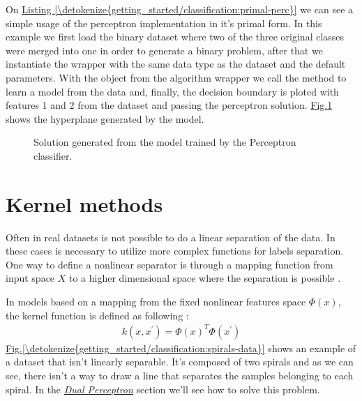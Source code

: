\documentclass[letterpaper,10pt,english]{sphinxmanual}
\let\sphinxpxdimen\pdfpxdimen\else\newdimen\sphinxpxdimen
\begin{document}
\sphinxAtStartPar
On \hyperref[\detokenize{getting_started/classification:primal-perc}]{Listing \ref{\detokenize{getting_started/classification:primal-perc}}} we can see a simple usage of the  perceptron implementation in it’s primal form. In this example we first
load the binary  dataset where two of the three original classes were merged into one in order to generate a binary problem, after that we instantiate
the  wrapper with the same data type as the dataset and the default parameters. With the object from the algorithm wrapper we call the
method  to learn a model from the data and, finally, the decision boundary is ploted with features 1 and 2 from the dataset and passing the perceptron solution. \hyperref[\detokenize{getting_started/classification:primal-perc-hyp}]{Fig.\@ \ref{\detokenize{getting_started/classification:primal-perc-hyp}}}
shows the hyperplane generated by the model.

\begin{figure}[htbp]
\centering
\capstart

\noindent\sphinxincludegraphics[width=450\sphinxpxdimen]{{ima-iris-2dsol}.png}
\caption{Solution generated from the model trained by the Perceptron classifier.}\label{\detokenize{getting_started/classification:primal-perc-hyp}}\end{figure}


\section{Kernel methods}
\label{\detokenize{getting_started/classification:kernel-methods}}
\sphinxAtStartPar
Often in real datasets is not possible to do a linear separation of the data. In these cases is necessary
to utilize more complex functions for labels separation. One way to define a non\sphinxhyphen{}linear separator is through
a mapping function from input space \(X\) to a higher dimensional space where the separation is possible .

\sphinxAtStartPar
In models based on a mapping from the fixed non\sphinxhyphen{}linear features space \(\Phi(x)\), the kernel function is defined
as following :
\begin{equation}\label{equation:getting_started/classification:kernel-func}
\begin{split}k(x, x^{'}) = \Phi(x)^{T}\Phi(x^{'})\end{split}
\end{equation}
\sphinxAtStartPar
\hyperref[\detokenize{getting_started/classification:spirals-data}]{Fig.\@ \ref{\detokenize{getting_started/classification:spirals-data}}} shows an example of a dataset that isn’t linearly separable. It’s composed of two spirals and as we can see, there isn’t a way to
draw a line that separates the samples belonging to each spiral. In the {\hyperref[\detokenize{getting_started/classification:the-perceptron-dual-algorithm}]{\emph{Dual Perceptron}}} section we’ll see how to solve this problem.
\end{document}
